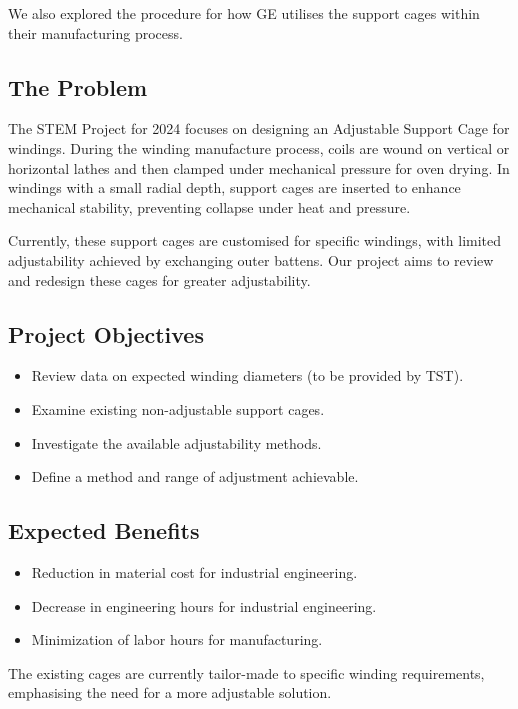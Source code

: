 \documentclass[a4paper,10pt]{article}
\begin{document}
We also explored the procedure for how \gls{GE} utilises the support cages within their manufacturing process.

\subsection{The Problem}
The STEM Project for 2024 focuses on designing an Adjustable Support Cage for windings. During the winding manufacture process, coils are wound on vertical or horizontal lathes and then clamped under mechanical pressure for oven drying. In windings with a small radial depth, support cages are inserted to enhance mechanical stability, preventing collapse under heat and pressure.

Currently, these support cages are customised for specific windings, with limited adjustability achieved by exchanging outer battens. Our project aims to review and redesign these cages for greater adjustability.

\subsection{Project Objectives}
\begin{itemize}
  \item Review data on expected winding diameters (to be provided by TST).
  \item Examine existing non-adjustable support cages.
  \item Investigate the available adjustability methods.
  \item Define a method and range of adjustment achievable.
\end{itemize}

\subsection{Expected Benefits}
\begin{itemize}
  \item Reduction in material cost for industrial engineering.
  \item Decrease in engineering hours for industrial engineering.
  \item Minimization of labor hours for manufacturing.
\end{itemize}

The existing cages are currently tailor-made to specific winding requirements, emphasising the need for a more adjustable solution.
\end{document}
